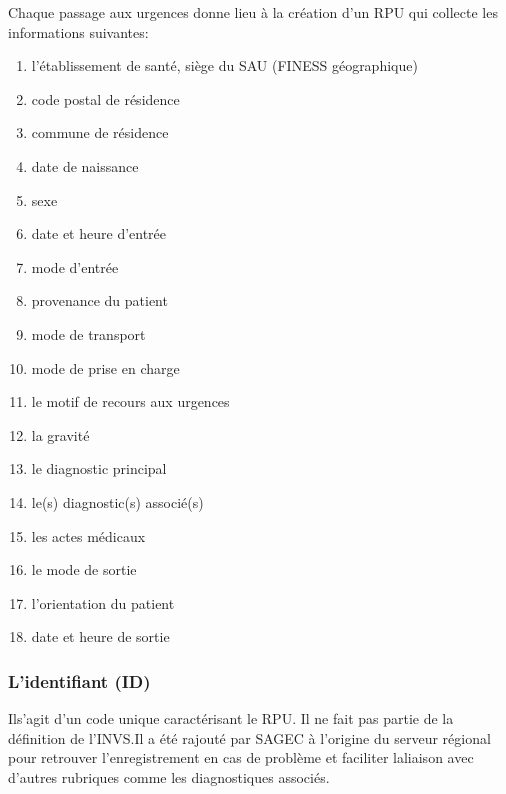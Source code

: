 \documentclass[12pt,english,french,twoside]{report}\usepackage[]{graphicx}\usepackage[]{color}
\begin{document}
Chaque passage aux urgences donne lieu à la création d'un RPU qui collecte les informations suivantes:
\begin{enumerate}
  \item l'établissement de santé, siège du SAU (FINESS géographique)
  \item code postal de résidence
  \item commune de résidence
  \item date de naissance
  \item sexe
  \item date et heure d'entrée
  \item mode d'entrée
  \item provenance du patient
  \item mode de transport
  \item mode de prise en charge
  \item le motif de recours aux urgences
  \item la gravité
  \item le diagnostic principal
  \item le(s) diagnostic(s) associé(s)
  \item les actes médicaux
  \item le mode de sortie
  \item l'orientation du patient
  \item date et heure de sortie
\end{enumerate}

\subsubsection{L'identifiant (ID)}

Ils'agit d'un code unique caractérisant le RPU. Il ne fait pas partie de la définition de l'INVS.Il a été rajouté par SAGEC à l'origine du serveur régional pour retrouver l'enregistrement en cas de problème et faciliter laliaison avec d'autres rubriques comme les diagnostiques associés.
\end{document}
